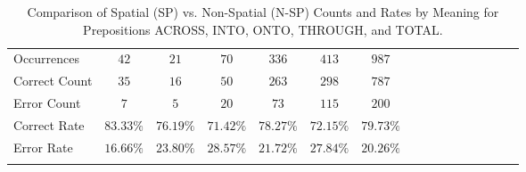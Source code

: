 \begin{landscape}
\begin{longtable}{lccccccccccccccc}
Occurrences & $42$ & $21$ & $70$ & $336$ & $413$ & $987$ \\
Correct Count & $35$ & $16$ & $50$ & $263$ & $298$ & $787$ \\
Error Count & $7$ & $5$ & $20$ & $73$ & $115$ & $200$\\
\midrule
Correct Rate & $83.33\%$ & $76.19\%$ & $71.42\%$ & $78.27\%$ & $72.15\%$ & $79.73\%$\\
\midrule
Error Rate & $16.66\%$ & $23.80\%$ & $28.57\%$ & $21.72\%$ & $27.84\%$ & $20.26\%$\\
\bottomrule
\caption{Comparison of Spatial (SP) vs. Non-Spatial (N-SP) Counts and Rates by Meaning for Prepositions ACROSS, INTO, ONTO, THROUGH, and TOTAL.}
\label{tab:combined}
\end{longtable}
\end{landscape}


